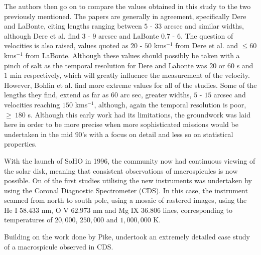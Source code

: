 The authors then go on to compare the values obtained in this study to the two previously mentioned. The papers are generally in agreement, specifically Dere and LaBonte, citing lengths ranging between $5$ - $33$ arcsec and similar widths, although Dere et al. find $3$ - $9$ arcsec and LaBonte $0.7$ - $6$.
The question of velocities is also raised, values quoted as $20$ - $50$ kms${^{-1}}$ from Dere et al. and $\leq60$ kms${^{-1}}$ from LaBonte.
Although these values should possibly be taken with a pinch of salt as the temporal resolution for Dere and Labonte was $20$ or $60$ s and $1$ min respectively, which will greatly influence the measurement of the velocity.
However, Bohlin et al. find more extreme values for all of the studies.
Some of the lengths they find, extend as far as $60$ arc sec, greater widths, $5$ - $15$ arcsec and velocities reaching $150$ kms${^{-1}}$, although, again the temporal resolution is poor, $\geq~180$ s.
Although this early work had its limitations, the groundwork was laid here in order to be more precise when more sophisticated missions would be undertaken in the mid $90$'s with a focus on detail and less so on statistical properties.

With the launch of SoHO in 1996, the community now had continuous viewing of the solar disk, meaning that consistent observations of macrospicules is now possible.
On of the first studies utilising the new instruments was undertaken by \cite{Pike1997} using the Coronal Diagnostic Spectrometer (CDS).
In this case, the instrument scanned from north to south pole, using a mosaic of rastered images, using the He I $58.433$ nm, O V $62.973$ nm and Mg IX $36.806$ lines, corresponding to temperatures of $20,000$, $250,000$ and $1,000,000$ K.


Building on the work done by Pike, \cite{Parenti2002} undertook an extremely detailed case study of a macrospicule observed in CDS.










 
































